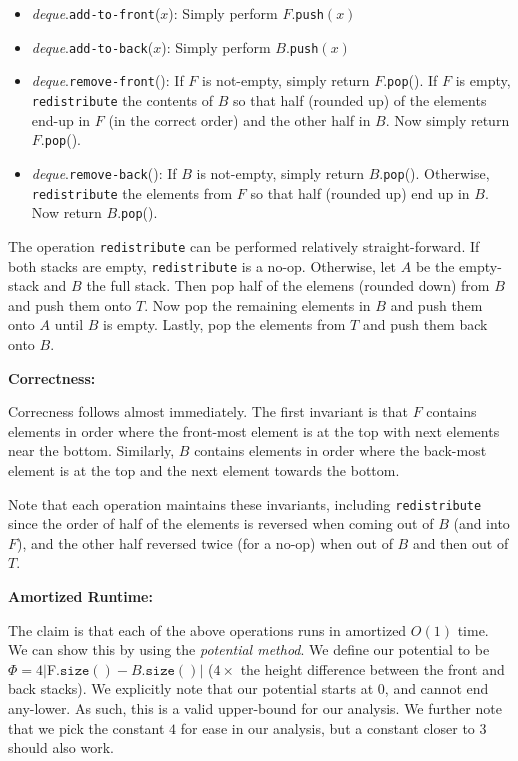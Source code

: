 \documentclass[12pt]{exam}
\newcommand*{\bigo}[1]{O \left( #1 \right)}
\begin{document}
\begin{questions}
\begin{solution}
\begin{itemize}
  \item \textit{deque}.\texttt{add-to-front}($x$): Simply perform $F$.\texttt{push}$(x)$
  \item \textit{deque}.\texttt{add-to-back}($x$): Simply perform $B$.\texttt{push}$(x)$
  \item \textit{deque}.\texttt{remove-front}(): If $F$ is not-empty, simply return $F$.\texttt{pop}(). If $F$ is empty, \texttt{redistribute} the contents of $B$ so that half (rounded up) of the elements end-up in $F$ (in the correct order) and the other half in $B$. Now simply return $F$.\texttt{pop}().
  \item \textit{deque}.\texttt{remove-back}(): If $B$ is not-empty, simply return $B$.\texttt{pop}(). Otherwise, \texttt{redistribute} the elements from $F$ so that half (rounded up) end up in $B$. Now return $B$.\texttt{pop}().
\end{itemize}

The operation \texttt{redistribute} can be performed relatively straight-forward. If both stacks are empty, \texttt{redistribute} is a no-op. Otherwise, let $A$ be the empty-stack and $B$ the full stack. Then pop half of the elemens (rounded down) from $B$ and push them onto $T$. Now pop the remaining elements in $B$ and push them onto $A$ until $B$ is empty. Lastly, pop the elements from $T$ and push them back onto $B$.

\textbf{Correctness:}

Correcness follows almost immediately. The first invariant is that $F$ contains elements in order where the front-most element is at the top with next elements near the bottom. Similarly, $B$ contains elements in order where the back-most element is at the top and the next element towards the bottom.

Note that each operation maintains these invariants, including \texttt{redistribute} since the order of half of the elements is reversed when coming out of $B$ (and into $F$), and the other half reversed twice (for a no-op) when out of $B$ and then out of $T$.


\textbf{Amortized Runtime:}

The claim is that each of the above operations runs in amortized $\bigo{1}$ time. We can show this by using the \textit{potential method}. We define our potential to be $\Phi = 4| $F$.\texttt{size}() - B.\texttt{size}() |$ ($4 \times$ the height difference between the front and back stacks). We explicitly note that our potential starts at $0$, and cannot end any-lower. As such, this is a valid upper-bound for our analysis. We further note that we pick the constant $4$ for ease in our analysis, but a constant closer to $3$ should also work.


\end{solution}
\end{questions}
\end{document}
